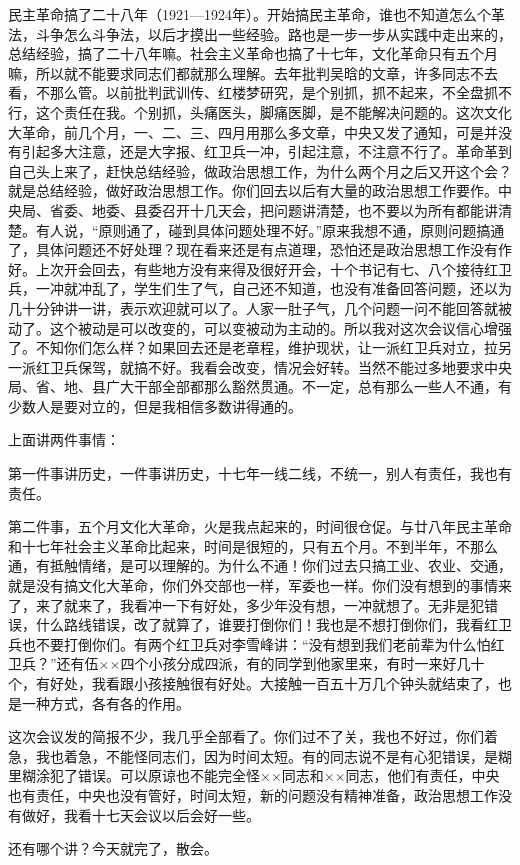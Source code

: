民主革命搞了二十八年（1921—1924年）。开始搞民主革命，谁也不知道怎么个革法，斗争怎么斗争法，以后才摸出一些经验。路也是一步一步从实践中走出来的，总结经验，搞了二十八年嘛。社会主义革命也搞了十七年，文化革命只有五个月嘛，所以就不能要求同志们都就那么理解。去年批判吴晗的文章，许多同志不去看，不那么管。以前批判武训传、红楼梦研究，是个别抓，抓不起来，不全盘抓不行，这个责任在我。个别抓，头痛医头，脚痛医脚，是不能解决问题的。这次文化大革命，前几个月，一、二、三、四月用那么多文章，中央又发了通知，可是并没有引起多大注意，还是大字报、红卫兵一冲，引起注意，不注意不行了。革命革到自己头上来了，赶快总结经验，做政治思想工作，为什么两个月之后又开这个会？就是总结经验，做好政治思想工作。你们回去以后有大量的政治思想工作要作。中央局、省委、地委、县委召开十几天会，把问题讲清楚，也不要以为所有都能讲清楚。有人说，“原则通了，碰到具体问题处理不好。”原来我想不通，原则问题搞通了，具体问题还不好处理？现在看来还是有点道理，恐怕还是政治思想工作没有作好。上次开会回去，有些地方没有来得及很好开会，十个书记有七、八个接待红卫兵，一冲就冲乱了，学生们生了气，自己还不知道，也没有准备回答问题，还以为几十分钟讲一讲，表示欢迎就可以了。人家一肚子气，几个问题一问不能回答就被动了。这个被动是可以改变的，可以变被动为主动的。所以我对这次会议信心增强了。不知你们怎么样？如果回去还是老章程，维护现状，让一派红卫兵对立，拉另一派红卫兵保驾，就搞不好。我看会改变，情况会好转。当然不能过多地要求中央局、省、地、县广大干部全部都那么豁然贯通。不一定，总有那么一些人不通，有少数人是要对立的，但是我相信多数讲得通的。

上面讲两件事情：

第一件事讲历史，一件事讲历史，十七年一线二线，不统一，别人有责任，我也有责任。

第二件事，五个月文化大革命，火是我点起来的，时间很仓促。与廿八年民主革命和十七年社会主义革命比起来，时间是很短的，只有五个月。不到半年，不那么通，有抵触情绪，是可以理解的。为什么不通！你们过去只搞工业、农业、交通，就是没有搞文化大革命，你们外交部也一样，军委也一样。你们没有想到的事情来了，来了就来了，我看冲一下有好处，多少年没有想，一冲就想了。无非是犯错误，什么路线错误，改了就算了，谁要打倒你们！我也是不想打倒你们，我看红卫兵也不要打倒你们。有两个红卫兵对李雪峰讲：“没有想到我们老前辈为什么怕红卫兵？”还有伍××四个小孩分成四派，有的同学到他家里来，有时一来好几十个，有好处，我看跟小孩接触很有好处。大接触一百五十万几个钟头就结束了，也是一种方式，各有各的作用。

这次会议发的简报不少，我几乎全部看了。你们过不了关，我也不好过，你们着急，我也着急，不能怪同志们，因为时间太短。有的同志说不是有心犯错误，是糊里糊涂犯了错误。可以原谅也不能完全怪××同志和××同志，他们有责任，中央也有责任，中央也没有管好，时间太短，新的问题没有精神准备，政治思想工作没有做好，我看十七天会议以后会好一些。

还有哪个讲？今天就完了，散会。


